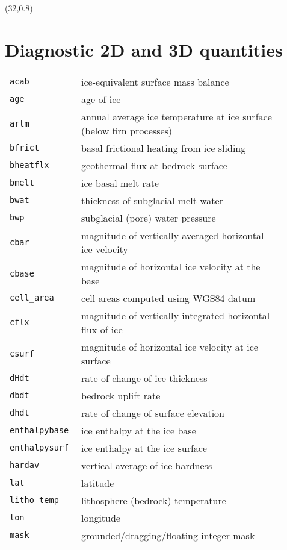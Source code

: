 \documentclass[landscape]{article}
\begin{document}
\begin{textblock}{15}(32,0.8)
\section{Diagnostic 2D and 3D quantities}
\label{sec:diagnostics}
\begin{tabular}{@{}p{0.2\linewidth}p{0.7\linewidth}@{}}
  \texttt{acab} &  ice-equivalent surface mass balance\\
  \texttt{age} &  age of ice \\
  \texttt{artm} &  annual average ice temperature at ice surface (below firn processes)\\
  \texttt{bfrict} &  basal frictional heating from ice sliding \\
  \texttt{bheatflx} &  geothermal flux at bedrock surface \\
  \texttt{bmelt} &  ice basal melt rate\\
  \texttt{bwat} &  thickness of subglacial melt water \\
  \texttt{bwp} &  subglacial (pore) water pressure \\
  \texttt{cbar} &  magnitude of vertically averaged horizontal ice velocity \\
  \texttt{cbase} &  magnitude of horizontal ice velocity at the base\\
  \texttt{cell_area} & cell areas computed using WGS84 datum\\
  \texttt{cflx} &  magnitude of vertically-integrated horizontal flux of ice \\
  \texttt{csurf} &  magnitude of horizontal ice velocity at ice surface \\
  \texttt{dHdt} &  rate of change of ice thickness \\
  \texttt{dbdt} &  bedrock uplift rate \\
  \texttt{dhdt} &  rate of change of surface elevation \\
  \texttt{enthalpybase} &  ice enthalpy at the ice base\\
  \texttt{enthalpysurf} &  ice enthalpy at the ice surface\\
  \texttt{hardav} &  vertical average of ice hardness \\
  \texttt{lat} &  latitude \\
  \texttt{litho_temp} &  lithosphere (bedrock) temperature\\
  \texttt{lon} &  longitude \\
  \texttt{mask} &  grounded/dragging/floating integer mask \\

\end{tabular}
\end{textblock}
\end{document}
